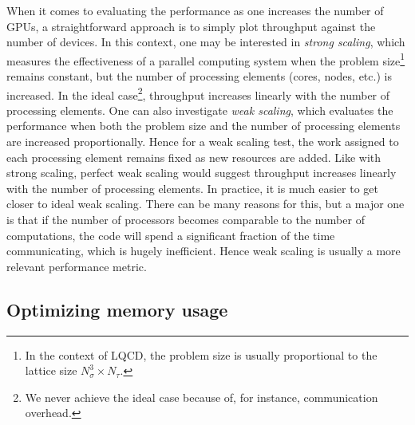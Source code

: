 When it comes to evaluating the performance as one increases the number
of GPUs, a straightforward approach is to simply plot throughput against
the number of devices. In this context, one may be interested in
{\it strong scaling}, which measures the effectiveness 
of a parallel computing system when the problem size\footnote{In the context
of LQCD, the problem size is usually proportional to the lattice size
$N_\sigma^3\times N_\tau$.} remains constant, 
but the number of processing elements (cores, nodes, etc.) is increased.
In the ideal case\footnote{We never achieve the ideal case because of,
for instance, communication overhead.}, throughput
increases linearly with the number of processing elements.
One can also investigate {\it weak scaling},
which evaluates the performance when both the problem size and the number 
of processing elements are increased proportionally. 
Hence for a weak scaling test, the work assigned to each processing element 
remains fixed as new resources are added. Like with strong scaling,
perfect weak scaling would suggest throughput increases linearly with
the number of processing elements. In practice, it is much easier to
get closer to ideal weak scaling. There can be many reasons
for this, but a major one is that if the number of processors becomes
comparable to the number of computations, the code will spend a significant fraction
of the time communicating, which is hugely inefficient. Hence weak scaling is
usually a more relevant performance metric. 


\subsection{Optimizing memory usage}\label{sec:memory}

